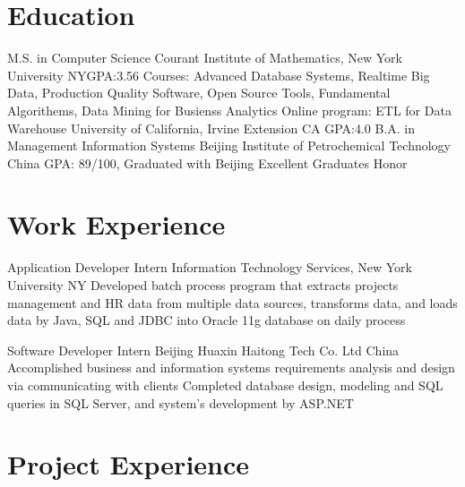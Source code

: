 \documentclass[11pt,a4paper,sans]{moderncv}   %
\begin{document}
\maketitle

\section{Education}
{M.S. in Computer Science}
{Courant Institute of Mathematics, New York University}
{NY}{GPA:3.56}
{Courses: Advanced Database Systems, Realtime Big Data, Production Quality Software, Open Source Tools, Fundamental Algorithems, Data Mining for Busienss Analytics}
{Online program: ETL for Data Warehouse}
{University of California, Irvine Extension}
{CA}
{GPA:4.0}
{}
{B.A. in Management Information Systems}
{Beijing Institute of Petrochemical Technology}
{China}
{GPA: 89/100, Graduated with Beijing Excellent Graduates Honor}{}


\section{Work Experience}
\renewcommand{\baselinestretch}{1.0}

{Application Developer Intern}
{}
{Information Technology Services, New York University}
{NY}
{{Developed batch process program that extracts projects management and HR data from multiple data sources, transforms data, and loads data by Java, SQL and JDBC into Oracle 11g database on daily process}
}


{Software Developer Intern}
{}
{Beijing Huaxin Haitong Tech Co. Ltd}
{China}
{{Accomplished business and information systems requirements analysis and design via communicating with clients}
\newline
{Completed database design, modeling and SQL queries in SQL Server, and system’s development by ASP.NET}}



\section{Project Experience}
\renewcommand{\baselinestretch}{1.0}
\end{document}
